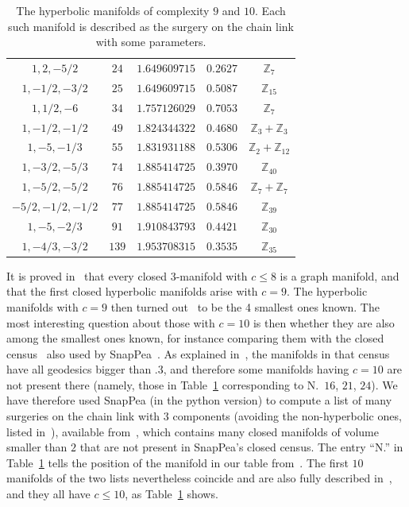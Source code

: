 \documentclass[10pt]{article}      %
\newcommand{\matZ} {\ensuremath {\mathbb{Z}}}
\begin{document}
\begin{table}
\begin{center}
\begin{tabular}{ccccc}
      $1,2,-5/2$      & $24$ & $1.649609715$ & $0.2627$ & $\matZ_7$ \\
      $1,-1/2,-3/2$   & $25$ & $1.649609715$ & $0.5087$ & $\matZ_{15}$ \\
      $1,1/2,-6$      & $34$ & $1.757126029$ & $0.7053$ & $\matZ_7$ \\
      $1,-1/2,-1/2$   & $49$ & $1.824344322$ & $0.4680$ & $\matZ_3 + \matZ_3$ \\
      $1,-5,-1/3$     & $55$ & $1.831931188$ & $0.5306$ & $\matZ_2 + \matZ_{12}$ \\
      $1,-3/2,-5/3$   & $74$ & $1.885414725$ & $0.3970$ & $\matZ_{40}$ \\
      $1,-5/2,-5/2$   & $76$ & $1.885414725$ & $0.5846$ & $\matZ_7 + \matZ_7$ \\
      $-5/2,-1/2,-1/2$& $77$ & $1.885414725$ & $0.5846$ & $\matZ_{39}$ \\
      $1,-5,-2/3$     & $91$ & $1.910843793$ & $0.4421$ & $\matZ_{30}$ \\
      $1,-4/3,-3/2$   & $139$ & $1.953708315$ & $0.3535$ & $\matZ_{35}$
		\end{tabular}
	\end{center}
  \caption{The hyperbolic manifolds of complexity $9$ and $10$. Each such manifold is
	described as the surgery on the chain link with some parameters.}
  \label{hyperbolic:table}
\end{table}

It is proved in~\cite{MaFo} that every closed 3-manifold with $c\leqslant 8$
is a graph manifold, and that the first closed hyperbolic manifolds arise with $c=9$. The hyperbolic
manifolds with $c=9$ then turned out~\cite{MaPe} to be the 4 smallest ones known. 
The most interesting question about those with $c=10$ is then whether they are also
among the smallest ones known, for instance
comparing them with the closed census~\cite{HoWe} also used by SnapPea~\cite{SnapPea}.
As explained in~\cite{DuTh}, the manifolds in that census have all geodesics bigger than $.3$,
and therefore some manifolds having $c=10$ are not present there
(namely, those in Table~\ref{hyperbolic:table} corresponding to N.~$16$, $21$, $24$).
We have therefore used SnapPea (in the python version)
to compute a list of many surgeries on the chain link with $3$ components 
(avoiding the non-hyperbolic ones, listed in~\cite{MaPe:chain}),
available from~\cite{weblist}, which contains many closed manifolds of volume smaller than $2$
that are not present in SnapPea's closed census. The entry ``N.'' in Table~\ref{hyperbolic:table}
tells the position of the manifold in our table from~\cite{weblist}.
The first $10$ manifolds of the two
lists nevertheless coincide and are also fully described in~\cite{HoWe}, and
they all have $c\leqslant 10$, as Table~\ref{hyperbolic:table} shows.
\end{document}
